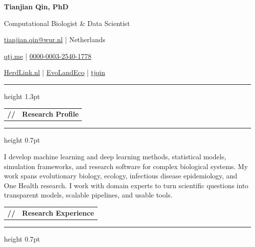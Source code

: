 \documentclass[10pt,a4paper]{article}
\makeatletter
\newcommand{\cvsection}[1]{%
  \Needspace{4\baselineskip}%
  \vspace{0.72em}%
  \noindent
  \begin{tabularx}{\textwidth}{@{}l@{\hspace{0.58em}}X@{}}
    {\color{Teal}\ttfamily\bfseries //} &
    {\large\bfseries\color{Teal} #1}
  \end{tabularx}
  \vspace{0.16em}\par
  {\color{Line}\hrule height 0.7pt}
  \vspace{0.42em}
}
\newcommand{\sep}{\enspace\textcolor{Line}{|}\enspace}
\makeatother
\begin{document}
\RaggedRight

\begin{minipage}[t]{0.54\textwidth}
  \vspace{0pt}
  {\fontsize{28}{30}\selectfont\bfseries\color{Navy} Tianjian Qin, PhD}\par
  \vspace{0.24em}
  {\large\color{Teal} Computational Biologist \& Data Scientist}\par
\end{minipage}
\hfill
\begin{minipage}[t]{0.42\textwidth}
  \vspace{0.15em}
  \raggedleft\small\color{Muted}
  \enspace
  \href{mailto:tianjian.qin@wur.nl}{tianjian.qin@wur.nl}
  \sep
  \enspace Netherlands\par
  \vspace{0.22em}
  \enspace\href{https://qtj.me}{qtj.me}
  \sep
  \enspace\href{https://orcid.org/0000-0003-2540-1778}{0000-0003-2540-1778}\par
  \vspace{0.22em}
  \enspace\href{https://herdlink.nl}{HerdLink.nl}
  \sep
  \enspace\href{https://github.com/EvoLandEco}{EvoLandEco}
  \sep
  \enspace\href{https://www.linkedin.com/in/tjqin}{tjqin}
\end{minipage}

\vspace{0.75em}
{\color{Teal}\hrule height 1.3pt}

\cvsection{Research Profile}

\begin{cvlist}
    \item I develop machine learning and deep learning methods, statistical models, simulation
    frameworks, and research software for complex biological systems. My work spans evolutionary
    biology, ecology, infectious disease epidemiology, and One Health research. I work with domain
    experts to turn scientific questions into transparent models, scalable pipelines, and usable tools.
\end{cvlist}

\cvsection{Research Experience}
\end{document}

